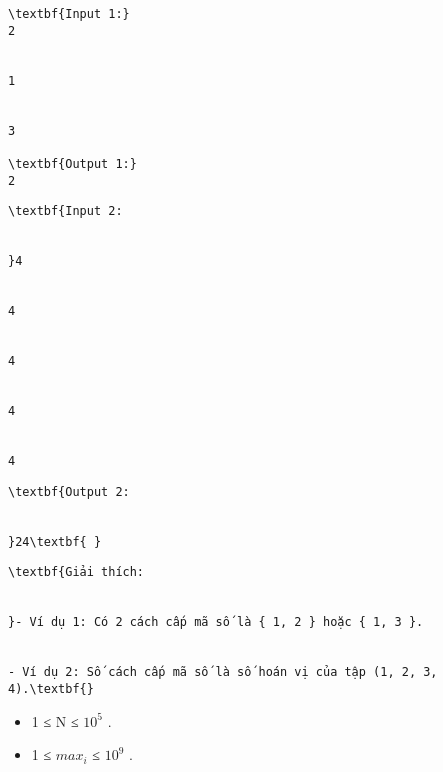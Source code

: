 \begin{verbatim}
\textbf{Input 1:}
2


1


3

\textbf{Output 1:}
2\end{verbatim}
\begin{verbatim}
\textbf{Input 2:


}4


4


4


4


4 \end{verbatim}
\begin{verbatim}
\textbf{Output 2:


}24\textbf{ }\end{verbatim}
\begin{verbatim}
\textbf{Giải thích:


}- Ví dụ 1: Có 2 cách cấp mã số là { 1, 2 } hoặc { 1, 3 }.


- Ví dụ 2: Số cách cấp mã số là số hoán vị của tập (1, 2, 3, 4).\textbf{}\end{verbatim}
\begin{itemize}
	\item     1 ≤ N ≤ $10^{5}$    .   
	\item     1 ≤ $max_{i}$    ≤ $10^{9}$    .   
\end{itemize}